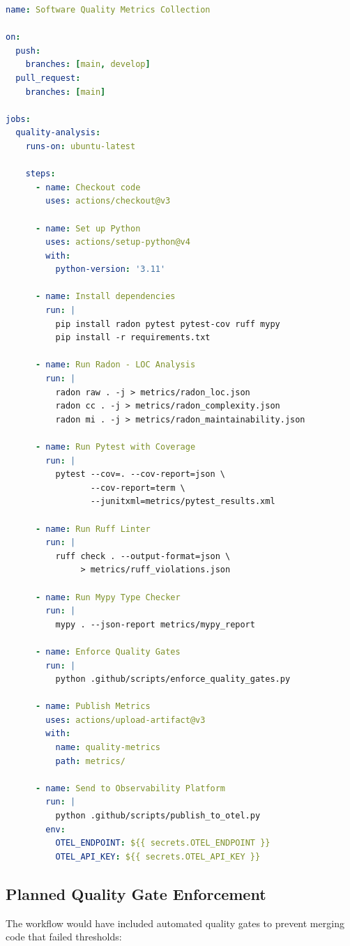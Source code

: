 \begin{lstlisting}[language=yaml, caption=Planned quality-metrics.yml Workflow]
name: Software Quality Metrics Collection

on:
  push:
    branches: [main, develop]
  pull_request:
    branches: [main]

jobs:
  quality-analysis:
    runs-on: ubuntu-latest

    steps:
      - name: Checkout code
        uses: actions/checkout@v3

      - name: Set up Python
        uses: actions/setup-python@v4
        with:
          python-version: '3.11'

      - name: Install dependencies
        run: |
          pip install radon pytest pytest-cov ruff mypy
          pip install -r requirements.txt

      - name: Run Radon - LOC Analysis
        run: |
          radon raw . -j > metrics/radon_loc.json
          radon cc . -j > metrics/radon_complexity.json
          radon mi . -j > metrics/radon_maintainability.json

      - name: Run Pytest with Coverage
        run: |
          pytest --cov=. --cov-report=json \
                 --cov-report=term \
                 --junitxml=metrics/pytest_results.xml

      - name: Run Ruff Linter
        run: |
          ruff check . --output-format=json \
               > metrics/ruff_violations.json

      - name: Run Mypy Type Checker
        run: |
          mypy . --json-report metrics/mypy_report

      - name: Enforce Quality Gates
        run: |
          python .github/scripts/enforce_quality_gates.py

      - name: Publish Metrics
        uses: actions/upload-artifact@v3
        with:
          name: quality-metrics
          path: metrics/

      - name: Send to Observability Platform
        run: |
          python .github/scripts/publish_to_otel.py
        env:
          OTEL_ENDPOINT: ${{ secrets.OTEL_ENDPOINT }}
          OTEL_API_KEY: ${{ secrets.OTEL_API_KEY }}
\end{lstlisting}

\subsection{Planned Quality Gate Enforcement}

The workflow would have included automated quality gates to prevent
merging code that failed thresholds:

